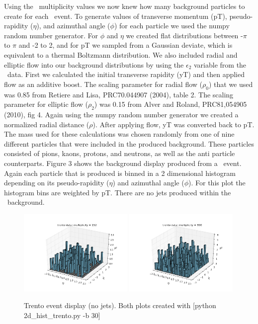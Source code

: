 \documentclass[11pt]{article}
\begin{document}
Using the \trento\ multiplicity values we now knew how many background particles to create for each \trento\ event. To generate values of transverse momentum (pT), pseudo-rapidity ($\eta$), and azimuthal angle ($\phi$) for each particle we used the numpy random number generator. For $\phi$  and $\eta$ we created flat distributions between -$\pi$ to $\pi$ and -2 to 2, and for pT we sampled from a Gaussian deviate, which is equivalent to a thermal Boltzmann distribution. We also included radial and elliptic flow into our background distributions by using the $\epsilon_2$ variable from the \trento\ data. First we calculated the initial transverse rapidity (yT) and then applied flow as an additive boost. The scaling parameter for radial flow ($\rho_0$) that we used was 0.85 from Retiere and Lisa, PRC70.044907 (2004), table 2.  The scaling parameter for elliptic flow ($\rho_2$) was 0.15 from Alver and Roland, PRC81,054905 (2010), fig 4. Again using the numpy random number generator we created a normalized radial distance ($\rho$). After applying flow, yT was converted back to pT. The mass used for these calculations was chosen randomly from one of nine different particles that were included in the produced background. These particles consisted of pions, kaons, protons, and neutrons, as well as the anti particle counterparts. Figure 3 shows the background display produced from a \trento\ event. Again each particle that is produced is binned in a 2 dimensional histogram depending on its pseudo-rapidity ($\eta$) and azimuthal angle ($\phi$). For this plot the histogram bins are weighted by pT. There are no jets produced within the \trento\ background.

\begin{figure}[h]
\begin{center}
\includegraphics[width=0.49\textwidth]{2d_hist_trento.png}
\includegraphics[width=0.49\textwidth]{2d_hist_trento2.png}
\label{fig_label}
\caption{Trento event display (no jets).  Both plots created with [python 2d\_hist\_trento.py -b 30]}
\end{center}
\end{figure}
\end{document}
